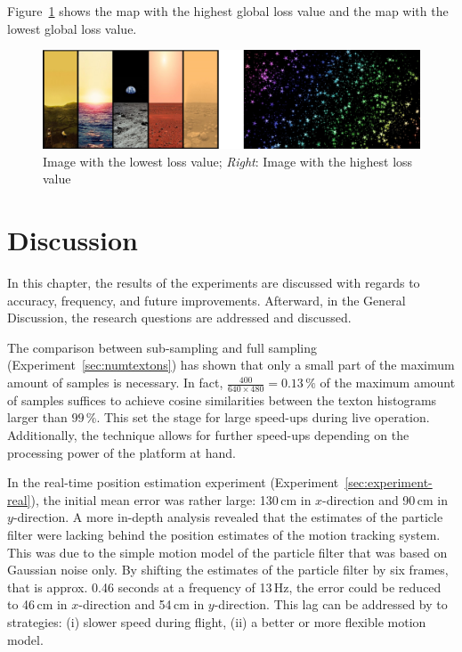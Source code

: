 \documentclass{report}
\begin{document}
Figure~\ref{fig:minmaximg} shows the map with the highest global loss
value and the map with the lowest global loss value.

\begin{figure}[h!]
\begin{center}
\includegraphics[width=0.7\columnwidth]{lowest_highest}
\caption{{\label{fig:minmaximg}
Image with the lowest loss value; \emph{Right}:
    Image with the highest loss value%
}}
\end{center}
\end{figure}

\chapter{Discussion}
\label{chap:discussion}

In this chapter, the results of the experiments are discussed with
regards to accuracy, frequency, and future improvements. Afterward, in
the General Discussion, the research questions are addressed and
discussed.

The comparison between sub-sampling and full sampling
(Experiment~\ref{sec:numtextons}) has shown that only a small part of
the maximum amount of samples is necessary. In fact,
$\frac{400}{640 \times 480} = 0.13\,\%$ of the maximum amount of
samples suffices to achieve cosine similarities between the texton
histograms larger than $99\,\%$. This set the stage for large
speed-ups during live operation. Additionally, the technique allows
for further speed-ups depending on the processing power of the
platform at hand.

In the real-time position estimation experiment
(Experiment~\ref{sec:experiment-real}), the initial mean error
was rather large: 130\,cm in $x$-direction and 90\,cm in
$y$-direction. A more in-depth analysis revealed that the estimates of
the particle filter were lacking behind the position estimates of the
motion tracking system. This was due to the simple motion model of the
particle filter that was based on Gaussian noise only. By shifting the
estimates of the particle filter by six frames, that is approx. 0.46
seconds at a frequency of 13\,Hz, the error could be reduced to 46\,cm
in $x$-direction and 54\,cm in $y$-direction. This lag can be
addressed by to strategies: (i) slower speed during flight, (ii) a
better or more flexible motion model.
\end{document}
